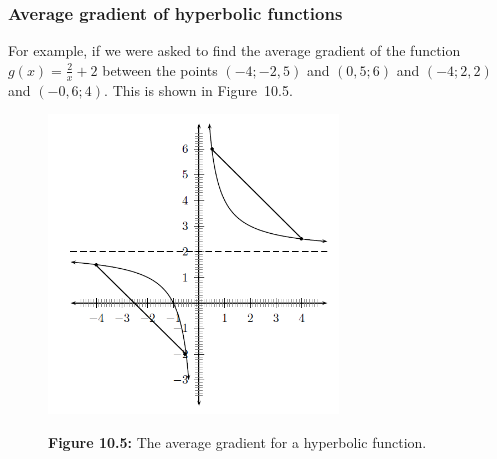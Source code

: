             \subsubsection{ Average gradient of hyperbolic functions}
            \nopagebreak
\label{m39223*id67324}For example, if we were asked to find the average gradient of the function $g\left(x\right)=\frac{2}{x}+2$ between the points \begin{math}\left(-4;-2,5\right)\end{math} and \begin{math}\left(0,5;6\right)\end{math} and \begin{math}\left(-4;2,2\right)\end{math} and \begin{math}\left(-0,6;4\right)\end{math}. This is shown in Figure~10.5.
    \setcounter{subfigure}{0}
	\begin{figure}[H] %
    \begin{center}
    \label{m39223*uid32!!!underscore!!!media}\label{m39223*uid32!!!underscore!!!printimage}\includegraphics[height=300px]{col11306.imgs/m39223_hyperbola.png} %
      \vspace{2pt}
    \vspace{\rubberspace}\par \begin{cnxcaption}
	  \small \textbf{Figure 10.5: }The average gradient for a hyperbolic function.
	\end{cnxcaption}
    \vspace{.1in}
    \end{center}
 \end{figure}       \par 
